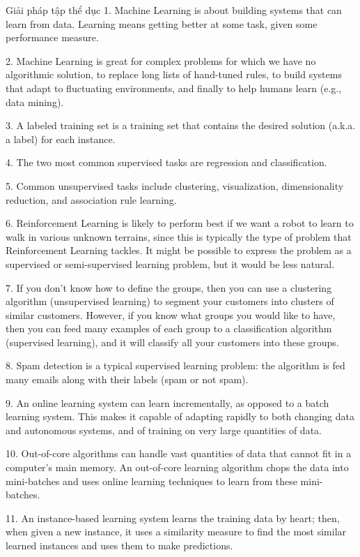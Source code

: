 \documentclass[aspectratio=169]{beamer}
\begin{document}
\begin{frame}[allowframebreaks]{Giải pháp tập thể dục}
1. Machine Learning is about building systems that can learn from data. Learning means getting better at some task, given some performance measure.

2. Machine Learning is great for complex problems for which we have no algorithmic solution, to replace long lists of hand-tuned rules, to build systems that adapt to fluctuating environments, and finally to help humans learn (e.g., data mining).

3. A labeled training set is a training set that contains the desired solution (a.k.a. a label) for each instance.

4. The two most common supervised tasks are regression and classification.

5. Common unsupervised tasks include clustering, visualization, dimensionality reduction, and association rule learning.

6. Reinforcement Learning is likely to perform best if we want a robot to learn to walk in various unknown terrains, since this is typically the type of problem that Reinforcement Learning tackles. It might be possible to express the problem as a supervised or semi-supervised learning problem, but it would be less natural.

7. If you don't know how to define the groups, then you can use a clustering algorithm (unsupervised learning) to segment your customers into clusters of similar customers. However, if you know what groups you would like to have, then you can feed many examples of each group to a classification algorithm (supervised learning), and it will classify all your customers into these groups.

8. Spam detection is a typical supervised learning problem: the algorithm is fed many emails along with their labels (spam or not spam).

9. An online learning system can learn incrementally, as opposed to a batch learning system. This makes it capable of adapting rapidly to both changing data and autonomous systems, and of training on very large quantities of data.

10. Out-of-core algorithms can handle vast quantities of data that cannot fit in a computer's main memory. An out-of-core learning algorithm chops the data into mini-batches and uses online learning techniques to learn from these mini-batches.

11. An instance-based learning system learns the training data by heart; then, when given a new instance, it uses a similarity measure to find the most similar learned instances and uses them to make predictions.


\end{frame}
\end{document}

